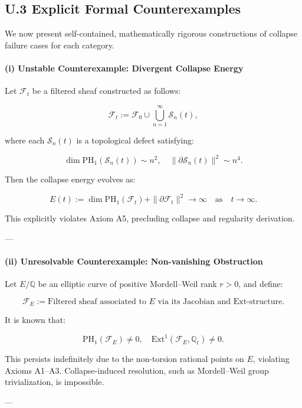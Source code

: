 \documentclass[11pt]{article}
\begin{document}
\subsection*{U.3 Explicit Formal Counterexamples}

We now present self-contained, mathematically rigorous constructions of collapse failure cases for each category.

\paragraph{(i) Unstable Counterexample: Divergent Collapse Energy}

Let $\mathcal{F}_t$ be a filtered sheaf constructed as follows:

\[
\mathcal{F}_t := \mathcal{F}_0 \cup \bigcup_{n=1}^\infty \mathcal{S}_n(t),
\]

where each $\mathcal{S}_n(t)$ is a topological defect satisfying:

\[
\dim \mathrm{PH}_1(\mathcal{S}_n(t)) \sim n^2, \quad \|\partial \mathcal{S}_n(t)\|^2 \sim n^4.
\]

Then the collapse energy evolves as:

\[
E(t) := \dim \mathrm{PH}_1(\mathcal{F}_t) + \|\partial \mathcal{F}_t\|^2 \longrightarrow \infty \quad \text{as} \quad t \to \infty.
\]

This explicitly violates Axiom A5, precluding collapse and regularity derivation.

---

\paragraph{(ii) Unresolvable Counterexample: Non-vanishing Obstruction}

Let $E/\mathbb{Q}$ be an elliptic curve of positive Mordell–Weil rank $r>0$, and define:

\[
\mathcal{F}_E := \text{Filtered sheaf associated to } E \text{ via its Jacobian and Ext-structure}.
\]

It is known that:

\[
\mathrm{PH}_1(\mathcal{F}_E) \neq 0, \quad \mathrm{Ext}^1(\mathcal{F}_E, \mathbb{Q}_\ell) \neq 0.
\]

This persists indefinitely due to the non-torsion rational points on $E$, violating Axioms A1–A3.  
Collapse-induced resolution, such as Mordell–Weil group trivialization, is impossible.

---
\end{document}
